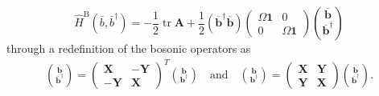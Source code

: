 \begin{equation}
\hat{H}^{\mathrm{B}}\left(\bar{b}, \bar{b}^{\dagger}\right)=-\frac{1}{2} \operatorname{tr} \mathbf{A}+\frac{1}{2}\left(\overline{\mathbf{b}}^{\dagger} \overline{\mathbf{b}}\right)\left(\begin{array}{cc}
\Omega \mathbf{1} & 0 \\
0 & \Omega \mathbf{1}
\end{array}\right)\binom{\overline{\mathbf{b}}}{\overline{\mathbf{b}}^{\dagger}}
\end{equation}
through a redefinition of the bosonic operators as
\begin{align}
\binom{\overline{\mathbf{b}}}{\overline{\mathbf{b}}^{\dagger}}=\left(\begin{array}{cc}
\mathbf{X} & -\mathbf{Y} \\
-\mathbf{Y} & \mathbf{X}
\end{array}\right)^T\binom{\mathbf{b}}{\mathbf{b}^{\dagger}} \quad \text{and} \quad
\binom{\mathbf{b}}{\mathbf{b}^{\dagger}}=\left(\begin{array}{ll}
\mathbf{X} & \mathbf{Y} \\
\mathbf{Y} & \mathbf{X}
\end{array}\right)\binom{\overline{\mathbf{b}}}{\overline{\mathbf{b}}^{\dagger}} .
\end{align}

